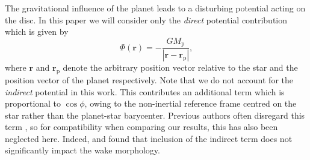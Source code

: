 The gravitational influence of the planet leads to a disturbing potential acting on the disc. In this paper we will consider only the \textit{direct} potential contribution which is given by
%
\begin{equation}
    \label{eqn:direct_potential}
    \Phi(\mathbf{r}) = -\frac{G M_\textrm{p}}{|\mathbf{r}-\mathbf{r}_\textrm{p}|} ,
\end{equation}
%
where $\mathbf{r}$ and $\mathbf{r}_\textrm{p}$ denote the arbitrary position vector relative to the star and the position vector of the planet respectively. Note that we do not account for the \textit{indirect} potential in this work. This contributes an additional term which is proportional to $\cos{\phi}$, owing to the non-inertial reference frame centred on the star rather than the planet-star barycenter. Previous authors often disregard this term \citep[e.g.][]{KorycanskyPollack_1993,PapaloizouLarwood_2000,TanakaEtAl_2002}, so for compatibility when comparing our results, this has also been neglected here. Indeed, \cite{MirandaRafikov_2019a} and  found that inclusion of the indirect term does not significantly impact the wake morphology.

